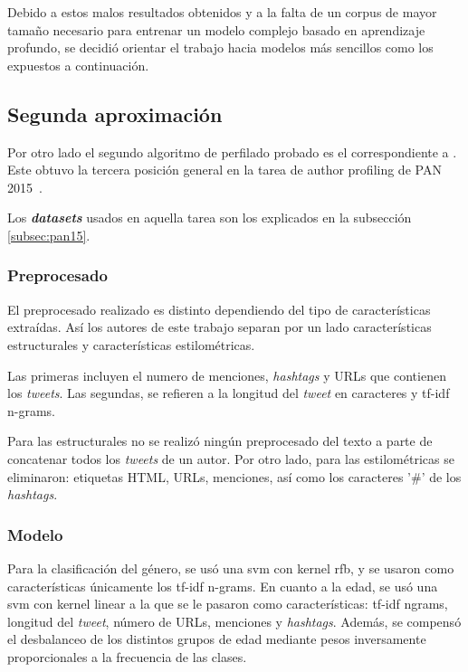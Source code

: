  Debido a estos malos resultados obtenidos y a la falta de un corpus de mayor tamaño necesario para entrenar un modelo complejo basado en aprendizaje profundo, se decidió orientar el trabajo hacia modelos más sencillos como los expuestos a continuación.

\subsection{Segunda aproximación}
\label{subsec:2aprox}

Por otro lado el segundo algoritmo de perfilado probado es el correspondiente a \citet{grivas2015author}. Este obtuvo la tercera posición general en la tarea de author profiling de PAN 2015~\citep{pan:2015}.

Los \textit{\textbf{datasets}} usados en aquella tarea son los explicados en la subsección \ref{subsec:pan15}.

\subsubsection{Preprocesado}
El preprocesado realizado es distinto dependiendo del tipo de características extraídas. Así los autores de este trabajo separan por un lado características estructurales y características estilométricas.

Las primeras incluyen el numero de menciones, \textit{hashtags} y URLs que contienen los \textit{tweets}. Las segundas, se refieren a la longitud del \textit{tweet} en caracteres y tf-idf n-grams.

Para las estructurales no se realizó ningún preprocesado del texto a parte de concatenar todos los \textit{tweets} de un autor. Por otro lado, para las estilométricas se eliminaron: etiquetas HTML, URLs, menciones, así como los caracteres '\#' de los \textit{hashtags}.

\subsubsection{Modelo}
Para la clasificación del género, se usó una \gls{svm} con kernel rfb, y se usaron como características únicamente los tf-idf n-grams. En cuanto a la edad, se usó una \gls{svm} con kernel linear a la que se le pasaron como características: tf-idf ngrams, longitud del \textit{tweet}, número de URLs, menciones y \textit{hashtags}. Además, se compensó el desbalanceo de los distintos grupos de edad mediante pesos inversamente proporcionales a la frecuencia de las clases.

